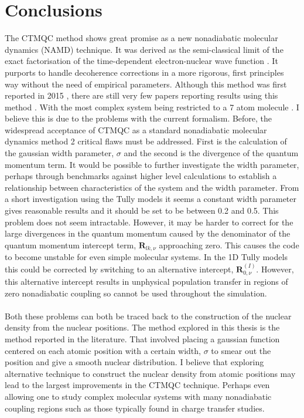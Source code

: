 \section{Conclusions}
The CTMQC method shows great promise as a new nonadiabatic molecular dynamics (NAMD) technique. It was derived as the semi-classical limit of the exact factorisation of the time-dependent electron-nuclear wave function \cite{abedi_exact_2010, agostini_semiclassical_2015}. It purports to handle decoherence corrections in a more rigorous, first principles way without the need of empirical parameters. Although this method was first reported in 2015 \cite{agostini_semiclassical_2015}, there are still very few papers reporting results using this method \cite{min_ab_2017, gossel_coupled-trajectory_2018,agostini_semiclassical_2015}. With the most complex system being restricted to a 7 atom molecule \cite{min_ab_2017}. I believe this is due to the problems with the current formalism. Before, the widespread acceptance of CTMQC as a standard nonadiabatic molecular dynamics method 2 critical flaws must be addressed. First is the calculation of the gaussian width parameter, $\sigma$ and the second is the divergence of the quantum momentum term. It would be possible to further investigate the width parameter, perhaps through benchmarks against higher level calculations to establish a relationship between characteristics of the system and the width parameter. From a short investigation using the Tully models it seems a constant width parameter gives reasonable results and it should be set to be between 0.2 and 0.5. This problem does not seem intractable. However, it may be harder to correct for the large divergences in the quantum momentum caused by the denominator of the quantum momentum intercept term, $\mathbf{R}_{lk, \nu}$ approaching zero. This causes the code to become unstable for even simple molecular systems. In the 1D Tully models this could be corrected by switching to an alternative intercept, $\mathbf{R}_{0, \nu}^{(I)}$. However, this alternative intercept results in unphysical population transfer in regions of zero nonadiabatic coupling so cannot be used throughout the simulation. 
\\\\
Both these problems can both be traced back to the construction of the nuclear density from the nuclear positions. The method explored in this thesis is the method reported in the literature. That involved placing a gaussian function centered on each atomic position with a certain width, $\sigma$ to smear out the position and give a smooth nuclear distribution. I believe that exploring alternative technique to construct the nuclear density from atomic positions may lead to the largest improvements in the CTMQC technique. Perhaps even allowing one to study complex molecular systems with many nonadiabatic coupling regions such as those typically found in charge transfer studies. 
